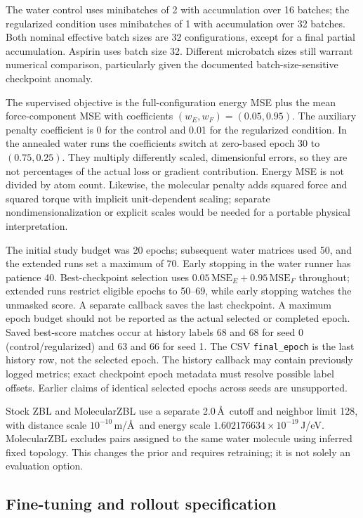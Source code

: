 \documentclass[11pt]{article}
\begin{document}
The water control uses minibatches of 2 with accumulation over 16 batches;
the regularized condition uses minibatches of 1 with accumulation over
32 batches. Both nominal effective batch sizes are 32 configurations,
except for a final partial accumulation. Aspirin uses batch size 32.
Different microbatch sizes still warrant numerical comparison, particularly
given the documented batch-size-sensitive checkpoint anomaly.

The supervised objective is the full-configuration energy MSE plus the
mean force-component MSE with coefficients $(w_E,w_F)=(0.05,0.95)$.
The auxiliary penalty coefficient is 0 for the control and 0.01 for the
regularized condition. In the annealed water runs the coefficients switch
at zero-based epoch 30 to $(0.75,0.25)$. They multiply differently scaled,
dimensionful errors, so they are not percentages of the actual loss or
gradient contribution. Energy MSE is not divided by atom count. Likewise,
the molecular penalty adds squared force and squared torque with implicit
unit-dependent scaling; separate nondimensionalization or explicit scales
would be needed for a portable physical interpretation.

The initial study budget was 20 epochs; subsequent water matrices used
50, and the extended runs set a maximum of 70. Early stopping in the
water runner has patience 40. Best-checkpoint selection uses
$0.05\,\mathrm{MSE}_E+0.95\,\mathrm{MSE}_F$ throughout; extended runs
restrict eligible epochs to 50--69, while early stopping watches the
unmasked score. A separate callback saves the last checkpoint. A maximum
epoch budget should not be reported as the actual selected or completed
epoch. Saved best-score matches occur at history labels 68 and 68 for
seed 0 (control/regularized) and 63 and 66 for seed 1. The CSV
\texttt{final\_epoch} is the last history row, not the selected epoch.
The history callback may contain previously logged metrics; exact
checkpoint epoch metadata must resolve possible label offsets. Earlier
claims of identical selected epochs across seeds are unsupported.

Stock ZBL and MolecularZBL use a separate 2.0\,\AA\ cutoff and neighbor
limit 128, with distance scale $10^{-10}$\,m/\AA\ and energy scale
$1.602176634\times10^{-19}$\,J/eV. MolecularZBL excludes pairs assigned
to the same water molecule using inferred fixed topology. This changes
the prior and requires retraining; it is not solely an evaluation option.

\subsection{Fine-tuning and rollout specification}
\end{document}
